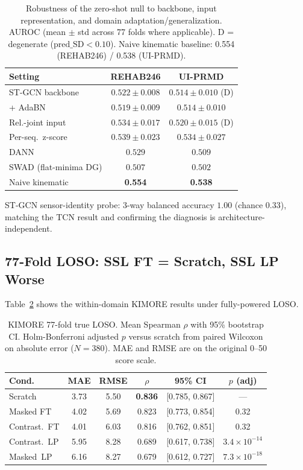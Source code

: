 \documentclass[10pt,journal]{IEEEtran}
\begin{document}
\begin{table}[t]
\centering
\small
\setlength{\tabcolsep}{3pt}
\caption{Robustness of the zero-shot null to backbone, input representation, and domain adaptation/generalization. AUROC (mean $\pm$ std across 77 folds where applicable). D = degenerate ($\text{pred\_SD}<0.10$). Naive kinematic baseline: 0.554 (REHAB246) / 0.538 (UI-PRMD).}
\label{tab:robustness-c}
\begin{tabular}{@{}lcc@{}}
\toprule
Setting & REHAB246 & UI-PRMD \\
\midrule
ST-GCN backbone         & $0.522{\pm}0.008$ & $0.514{\pm}0.010$ (D) \\
\quad + AdaBN           & $0.519{\pm}0.009$ & $0.514{\pm}0.010$ \\
Rel.-joint input        & $0.534{\pm}0.017$ & $0.520{\pm}0.015$ (D) \\
Per-seq.\ z-score       & $0.539{\pm}0.023$ & $0.534{\pm}0.027$ \\
DANN                    & $0.529$           & $0.509$ \\
SWAD (flat-minima DG)   & $0.507$           & $0.502$ \\
\midrule
Naive kinematic         & \textbf{0.554}    & \textbf{0.538} \\
\bottomrule
\end{tabular}
\end{table}

ST-GCN sensor-identity probe: 3-way balanced accuracy $1.00$ (chance $0.33$), matching the TCN result and confirming the diagnosis is architecture-independent.

\subsection{77-Fold LOSO: SSL FT = Scratch, SSL LP Worse}
\label{sec:loso-results}

Table~\ref{tab:loso} shows the within-domain KIMORE results under fully-powered LOSO.

\begin{table}[t]
\centering
\small
\setlength{\tabcolsep}{3pt}
\caption{KIMORE 77-fold true LOSO. Mean Spearman $\rho$ with 95\% bootstrap CI. Holm-Bonferroni adjusted $p$ versus scratch from paired Wilcoxon on absolute error ($N=380$). MAE and RMSE are on the original 0--50 score scale.}
\label{tab:loso}
\begin{tabular}{@{}lccccc@{}}
\toprule
Cond. & MAE & RMSE & $\rho$ & 95\% CI & $p$ (adj) \\
\midrule
Scratch     & 3.73 & 5.50 & \textbf{0.836} & [0.785, 0.867] & --- \\
Masked FT   & 4.02 & 5.69 & 0.823          & [0.773, 0.854] & 0.32 \\
Contrast.~FT & 4.01 & 6.03 & 0.816         & [0.762, 0.851] & 0.32 \\
Contrast.~LP & 5.95 & 8.28 & 0.689         & [0.617, 0.738] & $3.4{\times}10^{-14}$ \\
Masked~LP   & 6.16 & 8.27 & 0.679          & [0.612, 0.727] & $7.3{\times}10^{-18}$ \\
\bottomrule
\end{tabular}
\end{table}
\end{document}
